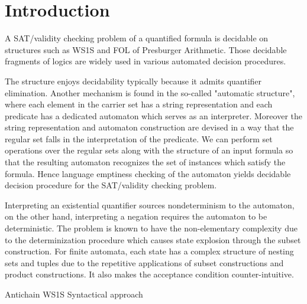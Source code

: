 \section{Introduction}


A SAT/validity checking problem of a quantified formula is decidable on
structures such as WS1S and FOL of Presburger Arithmetic. Those decidable
fragments of logics are widely used in various automated decision
procedures\cite{KlaEtAl:Mona}.

The structure enjoys decidability typically because it admits quantifier
elimination. Another mechanism is found in the so-called "automatic
structure"\cite{}, where each element in the carrier set has a string
representation and each predicate has a dedicated automaton which serves as an
interpreter. Moreover the string representation and automaton construction are
devised in a way that the regular set falls in the interpretation of the
predicate.   We can perform set operations over the regular sets along with the
structure of an input formula so that the resulting automaton recognizes the set
of instances which satisfy the formula. Hence language emptiness checking of the
automaton yields decidable decision procedure for the SAT/validity checking
problem.

Interpreting an existential quantifier sources nondeterminism to the automaton,
on the other hand, interpreting a negation requires the automaton to be
deterministic. The problem is known to have the non-elementary complexity due to
the determinization procedure which causes state explosion through the subset
construction. For finite automata, each state has a complex structure of nesting
sets and tuples due to the repetitive applications of subset constructions and
product constructions. It also makes the acceptance condition counter-intuitive.

 Antichain WS1S \cite{Fiedor2015,Fiedor2017}
 Syntactical approach\cite{Traytel15,TraytelN15}

